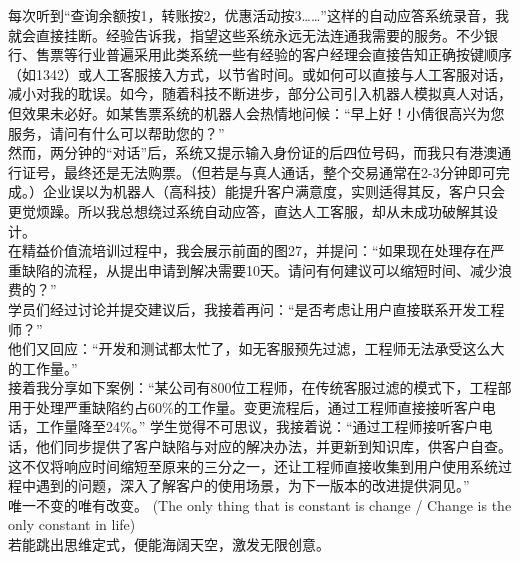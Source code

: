 每次听到``查询余额按1，转账按2，优惠活动按3\ldots{}\ldots{}''这样的自动应答系统录音，我就会直接挂断。经验告诉我，指望这些系统永远无法连通我需要的服务。不少银行、售票等行业普遍采用此类系统一些有经验的客户经理会直接告知正确按键顺序（如1342）或人工客服接入方式，以节省时间。或如何可以直接与人工客服对话，减小对我的耽误。如今，随着科技不断进步，部分公司引入机器人模拟真人对话，但效果未必好。如某售票系统的机器人会热情地问候：``早上好！小倩很高兴为您服务，请问有什么可以帮助您的？''\\
然而，两分钟的``对话''后，系统又提示输入身份证的后四位号码，而我只有港澳通行证号，最终还是无法购票。（但若是与真人通话，整个交易通常在2-3分钟即可完成。）企业误以为机器人（高科技）能提升客户满意度，实则适得其反，客户只会更觉烦躁。所以我总想绕过系统自动应答，直达人工客服，却从未成功破解其设计。\\
在精益价值流培训过程中，我会展示前面的图27，并提问：``如果现在处理存在严重缺陷的流程，从提出申请到解决需要10天。请问有何建议可以缩短时间、减少浪费的？''\\
学员们经过讨论并提交建议后，我接着再问：``是否考虑让用户直接联系开发工程师？''\\
他们又回应：``开发和测试都太忙了，如无客服预先过滤，工程师无法承受这么大的工作量。''\\
接着我分享如下案例：``某公司有800位工程师，在传统客服过滤的模式下，工程部用于处理严重缺陷约占60\%的工作量。变更流程后，通过工程师直接接听客户电话，工作量降至24\%。''
学生觉得不可思议，我接着说：``通过工程师接听客户电话，他们同步提供了客户缺陷与对应的解决办法，并更新到知识库，供客户自查。这不仅将响应时间缩短至原来的三分之一，还让工程师直接收集到用户使用系统过程中遇到的问题，深入了解客户的使用场景，为下一版本的改进提供洞见。''\\
唯一不变的唯有改变。 (The only thing that is constant is change / Change
is the only constant in life)\\
若能跳出思维定式，便能海阔天空，激发无限创意。



